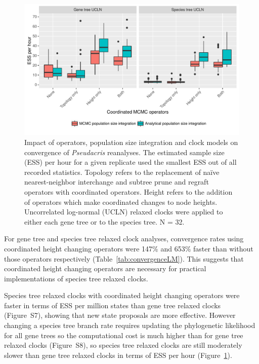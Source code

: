 \documentclass[nogrid]{MBE}%
\begin{document}
\begin{figure}[htb!]
\centering
\includegraphics[width=\textwidth]{minimum_ess_per_hour_boxplot.pdf}
\caption
{Impact of operators, population size integration and clock models on
convergence of \textit{Pseudacris} reanalyses. The estimated sample size (ESS)
per hour for a given replicate used the smallest ESS out of all recorded
statistics. Topology refers to the replacement of na\"ive nearest-neighbor
interchange and subtree prune and regraft operators with coordinated operators.
Height refers to the addition of operators which make coordinated changes to
node heights. Uncorrelated log-normal (UCLN) relaxed clocks were applied to
either each gene tree or to the species tree. N = 32.}
\label{fig:realEssPerHour}
\end{figure}

For gene tree and species tree relaxed clock analyses, convergence rates
using coordinated height changing operators were 147\% and 653\% faster than
without those operators respectively (Table~\ref{tab:convergenceLM}). This
suggests that coordinated height changing operators are necessary for practical
implementations of species tree relaxed clocks.

Species tree relaxed clocks with coordinated height changing operators were
faster in terms of ESS per million states than gene tree relaxed clocks
(Figure~S7), showing that new state proposals are more effective. However
changing a species tree branch rate requires updating the phylogenetic
likelihood for all gene trees so the computational cost is much higher than for
gene tree relaxed clocks (Figure~S8), so species tree relaxed clocks are still
moderately slower than gene tree relaxed clocks in terms of ESS per hour
(Figure~\ref{fig:realEssPerHour}).
\end{document}
